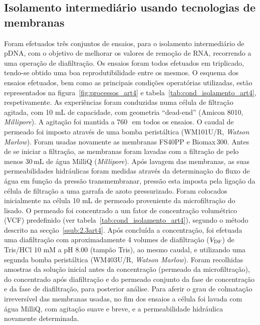 \subsection{Isolamento intermediário usando tecnologias de membranas} %
\label{sub:isol_mem_final}
%
Foram efetuados três conjuntos de ensaios, para o isolamento intermediário de pDNA, com o objetivo de melhorar os valores de remoção de RNA, recorrendo a uma operação de diafiltração. Os ensaios foram todos efetuados em triplicado, tendo-se obtido uma boa reprodutibilidade entre os mesmos. O esquema dos ensaios efetuados, bem como as principais condições operatórias utilizadas, estão representados na figura~\ref{fig:processos_art4} e tabela~\ref{tab:cond_isolamento_art4}, respetivamente. As experiências foram conduzidas numa célula de filtração agitada, com 10 mL de capacidade, com geometria ``dead-end'' (Amicon 8010, \emph{Millipore}). A agitação foi mantida a 760\,\minmum\ em todos os ensaios. O caudal de permeado foi imposto através de uma bomba peristáltica (WM101U/R, \emph{Watson Marlow}). Foram usadas novamente as membranas FS40PP e Biomax\,300. Antes de se iniciar a filtração, as membranas foram lavadas com a filtração de pelo menos 30\,mL de água MilliQ (\emph{Millipore}). Após lavagem das membranas, as suas permeabilidades hidráulicas foram medidas através da determinação do fluxo de água em função da pressão transmembranar, pressão esta imposta pela ligação da célula de filtração a uma garrafa de azoto pressurizado. Foram colocados inicialmente na célula 10 mL de permeado proveniente da microfiltração do lisado. O permeado foi concentrado a um fator de concentração volumétrico (VCF) predefinido (ver tabela~\ref{tab:cond_isolamento_art4}), segundo o método descrito na secção~\ref{ssub:2.3art4}. Após concluída a concentração, foi efetuada uma diafiltração com aproximadamente 4 volumes de diafiltração ($V_{\mathrm{DF}}$) de Tris/HCl 10 mM a pH 8.00 (tampão Tris), ao mesmo caudal, e utilizando uma segunda bomba peristáltica (WM403U/R, \emph{Watson Marlow}).
%
Foram recolhidas amostras da solução inicial antes da concentração (permeado da microfiltração), do concentrado após diafiltração e do permeado conjunto da fase de concentração e da fase de diafiltração, para posterior análise. Para aferir o grau de colmatação irreversível das membranas usadas, no fim dos ensaios a célula foi lavada com água MilliQ, com agitação suave e breve, e a permeabilidade hidráulica novamente determinada.

